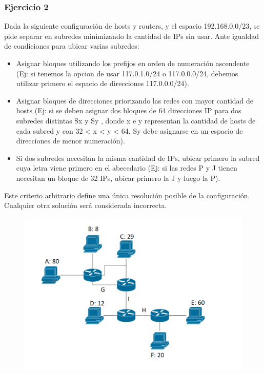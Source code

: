 \subsubsection{Ejercicio 2}

Dada la siguiente configuración de hosts y routers, y el espacio 192.168.0.0/23, se pide separar en subredes minimizando la cantidad de IPs sin usar. Ante igualdad de condiciones para ubicar varias subredes:
\begin{itemize}
    \item Asignar bloques utilizando los prefijos en orden de numeración ascendente (Ej: si tenemos la opcion de usar 117.0.1.0/24 o 117.0.0.0/24, debemos utilizar primero el espacio de direcciones 117.0.0.0/24).
    \item  Asignar bloques de direcciones priorizando las redes con mayor cantidad de hosts (Ej: si se deben asignar dos bloques de 64 direcciones IP para dos subredes distintas Sx y Sy , donde x e y representan la cantidad de hosts de cada subred y con 32 < x < y < 64, Sy debe asignarse en un espacio de direcciones de menor numeración).
    \item Si dos subredes necesitan la misma cantidad de IPs, ubicar primero la subred cuya letra viene primero en el abecedario (Ej: si las redes P y J tienen necesitan un bloque de 32 IPs, ubicar primero la J y luego la P).
\end{itemize}
Este criterio arbitrario define una única resolución posible de la configuración. Cualquier otra solución será considerada incorrecta.

\begin{figure}[H]
\centering
\includegraphics[width=\textwidth]{imagenes/subnetting2.png}
\end{figure}


